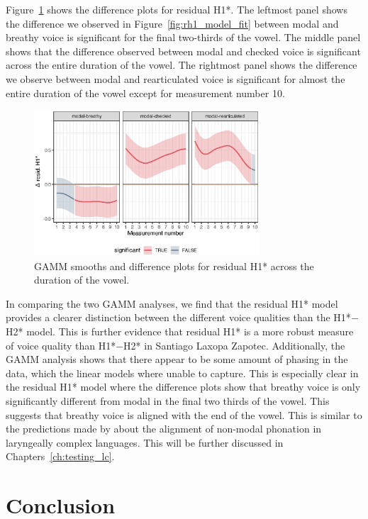Figure~\ref{fig:rh1_model_diff} shows the difference plots for residual H1*. The leftmost panel shows the difference we observed in Figure~\ref{fig:rh1_model_fit} between modal and breathy voice is significant for the final two-thirds of the vowel. The middle panel shows that the difference observed between modal and checked voice is significant across the entire duration of the vowel. The rightmost panel shows the difference we observe between modal and rearticulated voice is significant for almost the entire duration of the vowel except for measurement number 10.
\begin{figure}[h!]
  \centering
  \includegraphics[width = 0.75\textwidth]{images/SpectralSlopes_GAMMs/rh1_model_diff.eps}
  \caption{GAMM smooths and difference plots for residual H1* across the duration of the vowel.}
  \label{fig:rh1_model_diff}
\end{figure}

In comparing the two GAMM analyses, we find that the residual H1* model provides a clearer distinction between the different voice qualities than the H1*$-$H2* model. This is further evidence that residual H1* is a more robust measure of voice quality than H1*$-$H2* in Santiago Laxopa Zapotec. Additionally, the GAMM analysis shows that there appear to be some amount of phasing in the data, which the linear models where unable to capture. This is especially clear in the residual H1* model where the difference plots show that breathy voice is only significantly different from modal in the final two thirds of the vowel. This suggests that breathy voice is aligned with the end of the vowel. This is similar to the predictions made by \citet{silvermanLaryngealComplexityOtomanguean1997,silvermanPhasingRecoverability1997} about the alignment of non-modal phonation in laryngeally complex languages. This will be further discussed in Chapters~\ref{ch:testing_lc}.

\section{Conclusion} \label{sec:Conclusion}

